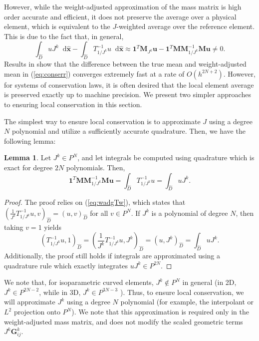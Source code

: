 \documentclass[preprint,10pt]{article}
\theoremstyle{definition}
\theoremstyle{lemma}
\newtheorem{lemma}{Lemma}
\theoremstyle{theorem}
\theoremstyle{assumption}
\renewcommand{\hat}{\widehat}
\newcommand{\LRp}[1]{\left( #1 \right)}
\newcommand*\diff[1]{\mathop{}\!{\mathrm{d}#1}} %
\begin{document}
{\[\]
However, while the weight-adjusted approximation of the mass matrix is high order accurate and efficient, it does not preserve the average over a physical element, which is equivalent to the $J$-weighted average over the reference element.  This is due to the fact that, in general,
\begin{equation}
\int_{\hat{D}}u J^k \diff{\hat{\bm{x}}} - \int_{\hat{D}} T_{1/J^k}^{-1}u \diff{\hat{\bm{x}}} \approx \bm{1}^T\bm{M}_{J^k}\bm{u} - \bm{1}^T\bm{M}\bm{M}_{1/J^k}^{-1}\bm{M}\bm{u} \neq 0.  
\label{eq:conserr}
\end{equation}
Results in \cite{chan2016weight1} show that the difference between the true mean and weight-adjusted mean in (\ref{eq:conserr}) converges extremely fast at a rate of $O(h^{2N+2})$.  However, for systems of conservation laws, it is often desired that the local element average is preserved exactly up to machine precision.  We present two simpler approaches to ensuring local conservation in this section.  

The simplest way to ensure local conservation is to approximate $J$ using a degree $N$ polynomial and utilize a sufficiently accurate quadrature.  Then, we have the following lemma:
\begin{lemma}
Let $J^k \in P^N$, and let integrals be computed using quadrature which is exact for degree $2N$ polynomials.  Then, 
\[
\bm{1}^T\bm{M}\bm{M}^{-1}_{1/J^k}\bm{M}\bm{u} = \int_{\hat{D}}T^{-1}_{1/J^k} u =  \int_{\hat{D}} u J^k.
\]
\label{eq:conscorrect1}
\end{lemma}
\begin{proof}
The proof relies on (\ref{eq:wadgTw}), which states that $\LRp{\frac{1}{J^k} T^{-1}_{1/J^k}u,v}_{\hat{D}} = \LRp{u,v}_{\hat{D}}$ for all $v\in P^N$.  If $J^k$ is a polynomial of degree $N$, then taking $v = 1$ yields
\[
\LRp{T^{-1}_{1/J^k}u,1}_{\hat{D}} = \LRp{\frac{1}{J^k}T^{-1}_{1/J^k}u,{J^k}}_{\hat{D}}= \LRp{u,{J^k}}_{\hat{D}} = \int_{\hat{D}} uJ^k. 
\]
Additionally, the proof still holds if integrals are approximated using a quadrature rule which exactly integrates $uJ^k \in P^{2N}$.
\end{proof}
We note that, for isoparametric curved elements, $J^k \not\in P^N$ in general (in 2D, $J^k \in P^{2N-2}$, while in 3D, $J^k \in P^{3N-3}$ \cite{johnen2013geometrical}).  Thus, to ensure local conservation, we will approximate $J^k$ using a degree $N$ polynomial (for example, the interpolant or $L^2$ projection onto $P^N$).  We note that this approximation is required only in the weight-adjusted mass matrix, and does not modify the scaled geometric terms $J^k\bm{G}^k_{ij}$.  

}
\end{document}
